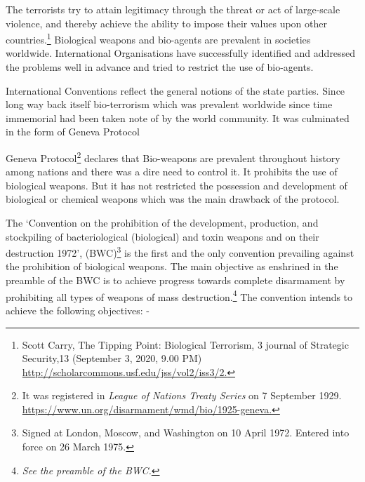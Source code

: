 \begin{multicols}{2}

\noi
The terrorists try to attain legitimacy through the threat or act of large-scale violence, and
thereby achieve the ability to impose their values upon other countries.\footnote{Scott Carry, The Tipping Point: Biological Terrorism, 3 journal of Strategic Security,13 (September 3, 2020,
9.00 PM) \url{http://scholarcommons.usf.edu/jss/vol2/iss3/2.}} Biological weapons
and bio-agents are prevalent in societies worldwide. International Organisations have
successfully identified and addressed the problems well in advance and tried to restrict the
use of bio-agents.

\vspace{-.2cm}


\vspace{-.2cm}

\noi
International Conventions reflect the general notions of the state parties. Since long way back
itself bio-terrorism which was prevalent worldwide since time immemorial had been taken
note of by the world community. It was culminated in the form of Geneva Protocol

\vspace{-.2cm}


\vspace{-.2cm}

\noi
Geneva Protocol\footnote{It was registered in \textit{League of Nations Treaty Series} on 7 September
1929. \url{https://www.un.org/disarmament/wmd/bio/1925-geneva.}} declares that Bio-weapons are prevalent throughout history among nations
and there was a dire need to control it. It prohibits the use of biological weapons. But it has
not restricted the possession and development of biological or chemical weapons which was
the main drawback of the protocol.


\noi
The ‘Convention on the prohibition of the development, production, and stockpiling of
bacteriological (biological) and toxin weapons and on their destruction 1972’, (BWC)\footnote{Signed at London, Moscow, and Washington on 10 April 1972. Entered into force on 26 March 1975.} is the 
first and the only convention prevailing against the prohibition of biological weapons. The
main objective as enshrined in the preamble of the BWC is to achieve progress towards
complete disarmament by prohibiting all types of weapons of mass destruction.\footnote{\textit{See the preamble of the BWC.}} The
convention intends to achieve the following objectives: -


\end{multicols}
